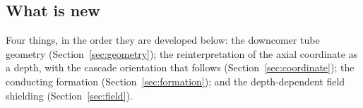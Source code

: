 \subsection{What is new}

Four things, in the order they are developed below: the downcomer tube
geometry (Section~\ref{sec:geometry}); the reinterpretation of the axial
coordinate as a depth, with the cascade orientation that follows
(Section~\ref{sec:coordinate}); the conducting formation
(Section~\ref{sec:formation}); and the depth-dependent field shielding
(Section~\ref{sec:field}).

